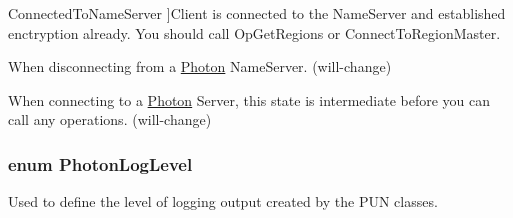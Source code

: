 \begin{Desc}
\begin{description}
{Connected\+To\+Name\+Server\hypertarget{group__public_api_gga91cc003c03acb26c6f1530440ebdbc88ac495884e9133962e72063062d1382466}{}\label{group__public_api_gga91cc003c03acb26c6f1530440ebdbc88ac495884e9133962e72063062d1382466}
}]Client is connected to the Name\+Server and established enctryption already. You should call Op\+Get\+Regions or Connect\+To\+Region\+Master.\item[{\em 
Disconnecting\+From\+Name\+Server\hypertarget{group__public_api_gga91cc003c03acb26c6f1530440ebdbc88aa3db59f96790ca93f6c8ac703735f401}{}\label{group__public_api_gga91cc003c03acb26c6f1530440ebdbc88aa3db59f96790ca93f6c8ac703735f401}
}]When disconnecting from a \hyperlink{namespace_photon}{Photon} Name\+Server. (will-\/change)\item[{\em 
Authenticating\hypertarget{group__public_api_gga91cc003c03acb26c6f1530440ebdbc88aedb214653d9f3cecd840463790ac2894}{}\label{group__public_api_gga91cc003c03acb26c6f1530440ebdbc88aedb214653d9f3cecd840463790ac2894}
}]When connecting to a \hyperlink{namespace_photon}{Photon} Server, this state is intermediate before you can call any operations. (will-\/change)\end{description}
\end{Desc}
\subsubsection[{\texorpdfstring{Photon\+Log\+Level}{PhotonLogLevel}}]{\setlength{\rightskip}{0pt plus 5cm}enum {\bf Photon\+Log\+Level}\hspace{0.3cm}{\ttfamily [strong]}}\hypertarget{group__public_api_gaf0468f6a0c8ab8caec09678e6dc6f3d5}{}\label{group__public_api_gaf0468f6a0c8ab8caec09678e6dc6f3d5}


Used to define the level of logging output created by the P\+UN classes. 

